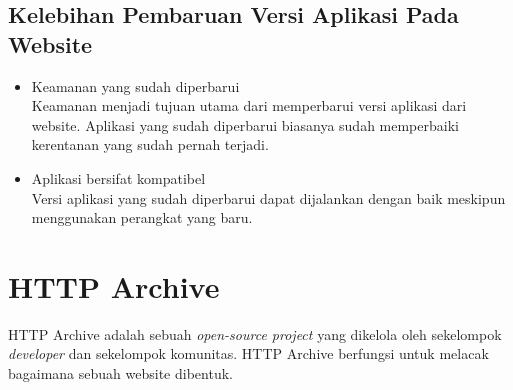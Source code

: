 \subsection{Kelebihan Pembaruan Versi Aplikasi Pada Website}
\begin{itemize}
	\item Keamanan yang sudah diperbarui\\
	Keamanan menjadi tujuan utama dari memperbarui versi aplikasi dari website. Aplikasi yang sudah diperbarui biasanya sudah memperbaiki kerentanan yang sudah pernah terjadi. 
	\item Aplikasi bersifat kompatibel\\
	Versi aplikasi yang sudah diperbarui dapat dijalankan dengan baik meskipun menggunakan perangkat yang baru. 
\end{itemize}



\section{HTTP Archive}
HTTP Archive adalah sebuah \textit{open-source project} yang dikelola oleh sekelompok \textit{developer} dan sekelompok komunitas. HTTP Archive berfungsi untuk melacak bagaimana sebuah website dibentuk.
